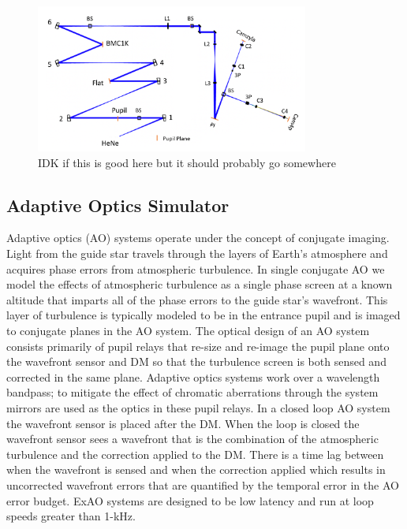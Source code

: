 \documentclass[12pt]{spieman}  %
\begin{document}
\begin{spacing}{2}
\begin{figure}
    \centering
    \includegraphics[width=0.8\textwidth]{CACTIzemax.png}
    \caption{IDK if this is good here but it should probably go somewhere}
    \label{fig:CACTIZemax}
\end{figure}

\subsection{Adaptive Optics Simulator}

Adaptive optics (AO) systems operate under the concept of conjugate imaging. Light from the guide star travels through the layers of Earth's atmosphere and acquires phase errors from atmospheric turbulence. In single conjugate AO we model the effects of atmospheric turbulence as a single phase screen at a known altitude that imparts all of the phase errors to the guide star's wavefront. This layer of turbulence is typically modeled to be in the entrance pupil and is imaged to conjugate planes in the AO system. The optical design of an AO system consists primarily of pupil relays that re-size and re-image the pupil plane onto the wavefront sensor and DM so that the turbulence screen is both sensed and corrected in the same plane. Adaptive optics systems work over a wavelength bandpass; to mitigate the effect of chromatic aberrations through the system mirrors are used as the optics in these pupil relays. In a closed loop AO system the wavefront sensor is placed after the DM. When the loop is closed the wavefront sensor sees a wavefront that is the combination of the atmospheric turbulence and the correction applied to the DM. There is a time lag between when the wavefront is sensed and when the correction applied which results in uncorrected wavefront errors that are quantified by the temporal error in the AO error budget. ExAO systems are designed to be low latency and run at loop speeds greater than 1-kHz.


\end{spacing}
\end{document}
